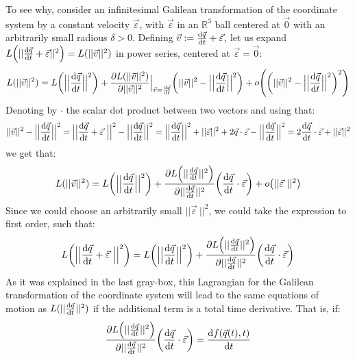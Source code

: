 \documentclass[11pt, a4paper]{article} %
\newcommand{\R}{\mathbb{R}} %
\begin{document}
To see why, consider an infinitesimal Galilean transformation of the coordinate system by a constant velocity $\vec{\varepsilon}$, with $\vec{\varepsilon}$ in an $\R^3$ ball centered at $\vec{0}$ with an arbitrarily small radious $\delta>0$. Defining $\vec{v}:=\dv{\vec{q}}{t}+\vec{\varepsilon}$, let us expand $L\qty( ||\dv{\vec{q}}{t}+\vec{\varepsilon}||^2)=L(||\vec{v}||^2)$ in power series, centered at $\vec{\varepsilon}=\vec{0}$:
\begin{equation}
L(||\vec{v}||^2)=L\qty(\Big|\Big|\dv{\vec{q}}{t}\Big|\Big|^2)+\pdv{L(||\vec{v}||^2)}{||\vec{v}||^2}\Big\rvert_{\vec{v}=\dv{\vec{q}}{t}}\qty(||\vec{v}||^2-\Big|\Big|\dv{\vec{q}}{t}\Big|\Big|^2)+o\qty(\qty(||\vec{v}||^2-\Big|\Big|\dv{\vec{q}}{t}\Big|\Big|^2)^2  )
\end{equation}
Denoting by $\cdot$ the scalar dot product between two vectors and using that:
\begin{equation}
||\vec{v}||^2-\Big|\Big|\dv{\vec{q}}{t}\Big|\Big|^2=\Big|\Big|\dv{\vec{q}}{t}+\vec{\varepsilon}\ \Big|\Big|^2-\Big|\Big|\dv{\vec{q}}{t}\Big|\Big|^2=\Big|\Big|\dv{\vec{q}}{t}\Big|\Big|^2+||\vec{\varepsilon}||^2+2\vec{q}\cdot \vec{\varepsilon}-\Big|\Big|\dv{\vec{q}}{t}\Big|\Big|^2=2\dv{\vec{q}}{t}\cdot \vec{\varepsilon}+||\vec{\varepsilon}||^2
\end{equation}
we get that:
\begin{equation}
L(||\vec{v}||^2)=L\qty(\Big|\Big|\dv{\vec{q}}{t}\Big|\Big|^2)+\pdv{L\qty(||\dv{\vec{q}}{t}||^2)}{||\dv{\vec{q}}{t}||^2}\qty(\dv{\vec{q}}{t}\cdot \vec{\varepsilon})+o\qty(||\vec{\varepsilon}\ ||^2  )
\end{equation}
Since we could choose an arbitrarily small $||\vec{\varepsilon}\ ||^2$, we could take the expression to first order, such that:
\begin{equation}
L\qty(\Big|\Big|\dv{\vec{q}}{t}+\vec{\varepsilon}\ \Big|\Big|^2)=L\qty(\Big|\Big|\dv{\vec{q}}{t}\Big|\Big|^2)+\pdv{L\qty(||\dv{\vec{q}}{t}||^2)}{||\dv{\vec{q}}{t}||^2}\qty(\dv{\vec{q}}{t}\cdot \vec{\varepsilon})
\end{equation}
As it was explained in the last gray-box, this Lagrangian for the Galilean transformation of the coordinate system will lead to the same equations of motion as $L(||\dv{\vec{q}}{t}||^2)$ if the additional term is a total time derivative. That is, if:
\begin{equation}
\pdv{L\qty(||\dv{\vec{q}}{t}||^2)}{||\dv{\vec{q}}{t}||^2}\qty(\dv{\vec{q}}{t}\cdot \vec{\varepsilon})=\dv{f(\vec{q}(t),t)}{t}
\end{equation}
\end{document}
